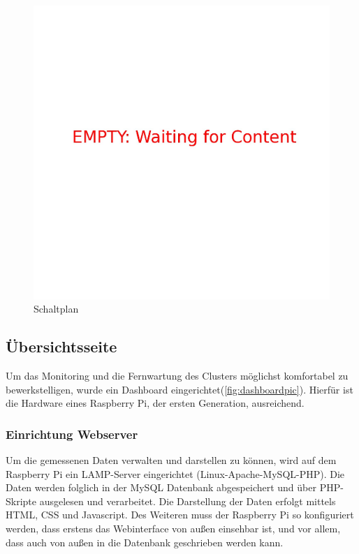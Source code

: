 \begin{minipage}{0.45\textwidth}
 \begin{figure}[H]
  \centering
    \includegraphics[width=\textwidth]{./Bilder/EMPTY.jpg}
\caption{Schaltplan}
    \label{fig:HWP_ICARUS_Schaltplan}
\end{figure}
\end{minipage}




\subsection{Übersichtsseite}
Um das Monitoring und die Fernwartung des Clusters möglichst komfortabel zu bewerkstelligen, wurde ein Dashboard eingerichtet(\ref{fig:dashboardpic}). Hierfür ist die Hardware eines Raspberry Pi, der ersten Generation, ausreichend.
\subsubsection{Einrichtung Webserver}
Um die gemessenen Daten verwalten und darstellen zu können, wird auf dem Raspberry Pi ein LAMP-Server eingerichtet (Linux-Apache-MySQL-PHP). Die Daten werden folglich in der MySQL Datenbank abgespeichert und über PHP-Skripte ausgelesen und verarbeitet. Die Darstellung der Daten erfolgt mittels HTML, CSS und Javascript. Des Weiteren muss der Raspberry Pi so konfiguriert werden, dass erstens das Webinterface von außen einsehbar ist, und vor allem, dass auch von außen in die Datenbank geschrieben werden kann.

